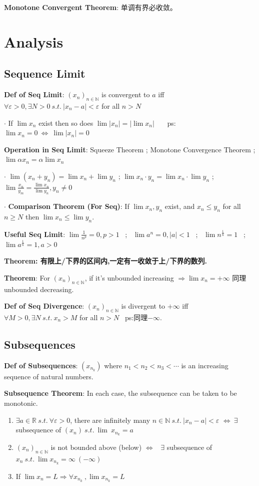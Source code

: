 \documentclass[11pt]{article}
\begin{document}
\textbf{Monotone Convergent Theorem}: 单调有界必收敛。


\section{Analysis} %
\subsection{Sequence Limit}

\textbf{Def of Seq Limit}: $(x_n)_{n\in\mathbb{N}}$ is convergent to $a$ iff $\forall\varepsilon>0,\exists N>0 \ s.t. \ |x_n-a|<\varepsilon$ for all $n>N$

$\cdot$ If $\lim x_n$ exist then so does $\lim |x_n|=|\lim x_n|$ \ \ \ ps:$\lim x_n=0 \ \Leftrightarrow \ \lim |x_n|=0$

\textbf{Operation in Seq Limit}: Squeeze Theorem ; Monotone Convergence Theorem ; $\lim \alpha x_n=\alpha\lim x_n$

$\cdot$ $\lim (x_n + y_n)=\lim x_n + \lim y_n$ ; $\lim x_n \cdot y_n=\lim x_n \cdot \lim y_n$ ; $\lim \frac{x_n}{y_m}=\frac{\lim x_n}{\lim y_n},y_n \ne 0$

$\cdot$ \textbf{Comparison Theorem (For Seq)}: If $\lim x_n,y_n$ exist, and $x_n\leq y_n$ for all $n\geq N$ then $\lim x_n\leq\lim y_n.$

\textbf{Useful Seq Limit}: $\lim \frac{1}{n^p}=0,p>1$ \ ; \ $\lim a^n=0,|a|<1$ \ ; \ $\lim n^\frac{1}{n}=1$ \ ; \ $\lim a^\frac{1}{n}=1,a>0$

\textbf{Theorem: 有限上/下界的区间内,一定有一收敛于上/下界的数列.}

\textbf{Theorem}: For $(x_n)_{n\in\mathbb{N}}$, if it's unbounded increasing $\Rightarrow \lim x_n=+\infty$ 同理 unbounded decreasing.

\textbf{Def of Seq Divergence}: $(x_n)_{n\in\mathbb{N}}$ is divergent to $+\infty$ iff $\forall M>0,\exists N \ s.t. \ x_n>M$ for all $n>N$ \ ps:同理$-\infty.$

\subsection{Subsequences}

\textbf{Def of Subsequences}: $(x_{n_k})$ where $n_1<n_2<n_3<\cdots$ is an increasing sequence of natural numbers.

\textbf{Subsequence Theorem}: In each case, the subsequence can be taken to be monotonic.
\begin{enumerate}[itemsep=-2pt, topsep=-2pt]
    \item $\exists a \in \mathbb{R} \ s.t. \ \forall \varepsilon > 0$, there are infinitely many $n \in \mathbb{N} \ s.t. \ |x_n - a|<\varepsilon$ $\Leftrightarrow \ \exists$ subsequence of $(x_n) \ s.t. \ \lim\ x_{n_k}=a$
    \item $(x_n)_{n \in \mathbb{N}}$ is not bounded above (below) $\Leftrightarrow$ \ $\exists$ subsequence of $x_n \ s.t. \ \lim x_{n_k}=\infty \ (-\infty)$
    \item If $\lim x_n=L \Rightarrow \forall x_{n_k} \ , \lim x_{n_k}=L$
\end{enumerate}
\end{document}
